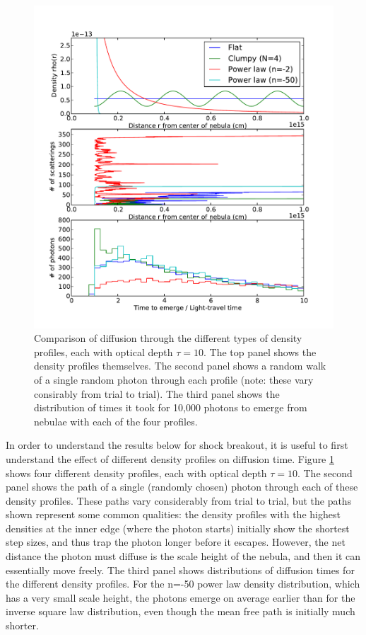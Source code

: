 \documentclass{amsart}
\begin{document}
\begin{figure}[h]
  \begin{center}
     \includegraphics[width=\textwidth]{densities}
  \end{center}
  \caption{Comparison of diffusion through the different types of density profiles, each with optical depth $\tau=10$. The top panel shows the density profiles themselves.  The second panel shows a random walk of a single random photon through each profile (note: these vary consirably from trial to trial). The third panel shows the distribution of times it took for 10,000 photons to emerge from nebulae with each of the four profiles.}
\label{fig:densities}
\end{figure}

In order to understand the results below for
shock breakout, it is useful to first understand the effect of different
density profiles on diffusion time.  Figure \ref{fig:densities} shows
four different density profiles, each with optical depth $\tau=10$. The second panel shows the path of a single (randomly chosen) photon through
each of these density profiles.  These paths vary considerably from trial to trial, but the paths shown represent some common qualities: the density
profiles with the highest densities at the inner edge (where the photon starts) initially show the shortest step sizes, and thus trap the photon longer before it escapes.  However, the net distance the photon must diffuse is the scale height of the nebula, and then it can essentially move freely.  The third panel shows distributions of diffusion times for the different density profiles.  For the n=-50 power law density distribution, which has a very small scale height, the photons emerge on average earlier than for the inverse square law distribution, even though the mean free path is initially much shorter.
\end{document}
